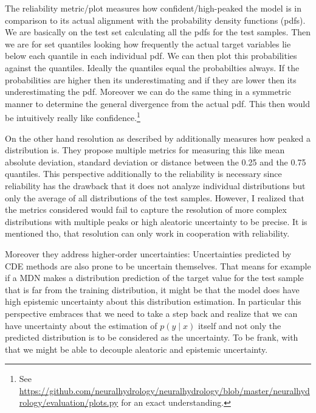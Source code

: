 \documentclass{article}
\begin{document}
The reliability metric/plot measures how confident/high-peaked the model is in comparison to its actual alignment with the probability density functions (pdfs). We are basically on the test set calculating all the pdfs for the test samples. Then we are for set quantiles looking how frequently the actual target variables lie below each quantile in each individual pdf. We can then plot this probabilities against the quantiles. Ideally the quantiles equal the probabilties always. If the probabilities are higher then its underestimating and if they are lower then its underestimating the pdf. Moreover we can do the same thing in a symmetric manner to determine the general divergence from the actual pdf. This then would be intuitively really like confidence.\footnote{See  \url{https://github.com/neuralhydrology/neuralhydrology/blob/master/neuralhydrology/evaluation/plots.py} for an exact understanding.}

On the other hand resolution as described by \citep{klotz2021uncertainty} additionally measures how peaked a distribution is. They propose multiple metrics for measuring this like mean absolute deviation, standard deviation or distance between the 0.25 and the 0.75 quantiles. This perspective additionally to the reliability is necessary since reliability has the drawback that it does not analyze individual distributions but only the average of all distributions of the test samples. However, I realized that the metrics considered would fail to capture the resolution of more complex distributions with multiple peaks or high aleatoric uncertainty to be precise. It is mentioned tho, that resolution can only work in cooperation with reliability.

Moreover they address higher-order uncertainties: Uncertainties predicted by CDE methods are also prone to be uncertain themselves. That means for example if a MDN makes a distribution prediction of the target value for the test sample that is far from the training distribution, it might be that the model does have high epistemic uncertainty about this distribution estimation. In particular this perspective embraces that we need to take a step back and realize that we can have uncertainty about the estimation of $p(y \mid x)$ itself and not only the predicted distribution is to be considered as the uncertainty. To be frank, with that we might be able to decouple aleatoric and epistemic uncertainty.
\end{document}
